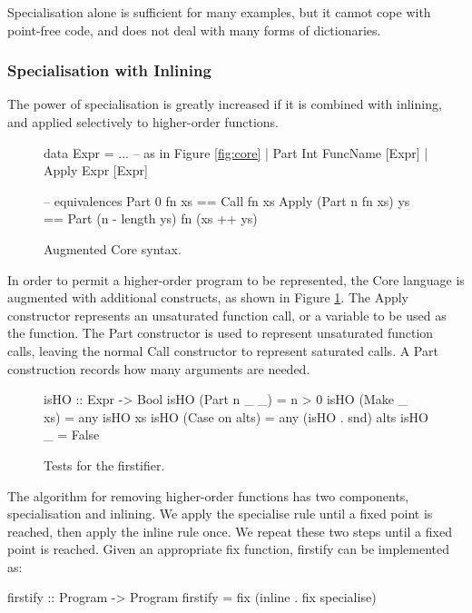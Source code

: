 \documentclass[preprint]{sigplanconf}
\newcommand{\C}[1]{\textsf{#1}}
\newcommand{\ignore}{}
\begin{document}
Specialisation alone is sufficient for many examples, but it cannot cope with point-free code, and does not deal with many forms of dictionaries.

\subsubsection{Specialisation with Inlining}

The power of specialisation is greatly increased if it is combined with inlining, and applied selectively to higher-order functions.

\begin{figure}
\ignore\begin{code}
data Expr  =  ... -- as in Figure {\ref{fig:core}}
           |  Part   Int FuncName [Expr]
           |  Apply  Expr [Expr]

-- equivalences
Part 0 fn xs == Call fn xs
Apply (Part n fn xs) ys == Part (n - length ys) fn (xs ++ ys)
\end{code}
\caption{Augmented Core syntax.}
\label{fig:core_ho}
\end{figure}

In order to permit a higher-order program to be represented, the Core language is augmented with additional constructs, as shown in Figure \ref{fig:core_ho}. The \C{Apply} constructor represents an unsaturated function call, or a variable to be used as the function. The \C{Part} constructor is used to represent unsaturated function calls, leaving the normal \C{Call} constructor to represent saturated calls. A \C{Part} construction records how many arguments are needed.

\begin{figure}
\ignore\begin{code}
isHO :: Expr -> Bool
isHO (Part n _ _)    = n > 0
isHO (Make _ xs)     = any isHO xs
isHO (Case on alts)  = any (isHO . snd) alts
isHO _               = False
\end{code}
\caption{Tests for the firstifier.}
\label{fig:isHO}
\end{figure}

The algorithm for removing higher-order functions has two components, specialisation and inlining. We apply the specialise rule until a fixed point is reached, then apply the inline rule once. We repeat these two steps until a fixed point is reached. Given an appropriate \C{fix} function, \C{firstify} can be implemented as:

\ignore\begin{code}
firstify :: Program -> Program
firstify = fix (inline . fix specialise)
\end{code}
\end{document}
